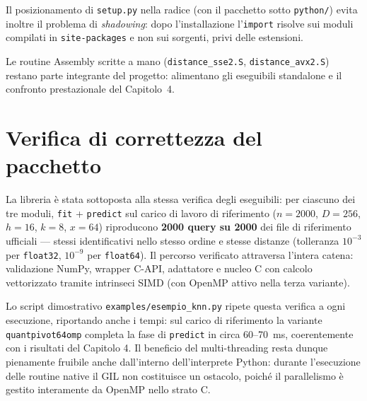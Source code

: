 Il posizionamento di \texttt{setup.py} nella radice (con il pacchetto sotto \texttt{python/}) evita inoltre il problema di \emph{shadowing}: dopo l'installazione l'\texttt{import} risolve sui moduli compilati in \texttt{site-packages} e non sui sorgenti, privi delle estensioni.

Le routine Assembly scritte a mano (\texttt{distance\_sse2.S}, \texttt{distance\_avx2.S}) restano parte integrante del progetto: alimentano gli eseguibili standalone e il confronto prestazionale del Capitolo~4.

\section{Verifica di correttezza del pacchetto}
La libreria è stata sottoposta alla stessa verifica degli eseguibili: per ciascuno dei tre moduli, \texttt{fit} + \texttt{predict} sul carico di lavoro di riferimento ($n=2000$, $D=256$, $h=16$, $k=8$, $x=64$) riproducono \textbf{2000 query su 2000} dei file di riferimento ufficiali — stessi identificativi nello stesso ordine e stesse distanze (tolleranza $10^{-3}$ per \texttt{float32}, $10^{-9}$ per \texttt{float64}). Il percorso verificato attraversa l'intera catena: validazione NumPy, wrapper C-API, adattatore e nucleo C con calcolo vettorizzato tramite intrinseci SIMD (con OpenMP attivo nella terza variante).

Lo script dimostrativo \texttt{examples/esempio\_knn.py} ripete questa verifica a ogni esecuzione, riportando anche i tempi: sul carico di riferimento la variante \texttt{quantpivot64omp} completa la fase di \texttt{predict} in circa 60--70~ms, coerentemente con i risultati del Capitolo 4. Il beneficio del multi-threading resta dunque pienamente fruibile anche dall'interno dell'interprete Python: durante l'esecuzione delle routine native il GIL non costituisce un ostacolo, poiché il parallelismo è gestito interamente da OpenMP nello strato C.
